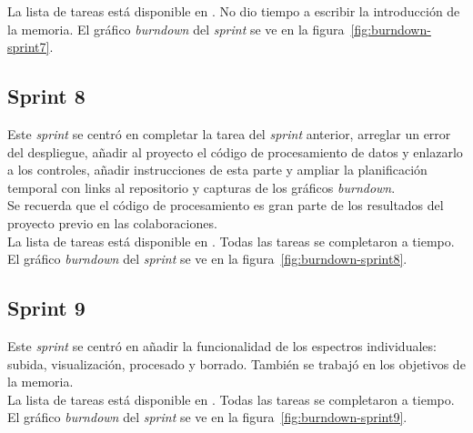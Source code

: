 La lista de tareas está disponible en
. No dio tiempo a escribir la introducción de la memoria. El gráfico
\textit{burndown} del \textit{sprint} se ve en la
figura~\ref{fig:burndown-sprint7}.\\


\subsection{Sprint 8}
Este \textit{sprint} se centró en completar la tarea del \textit{sprint}
anterior, arreglar un error del despliegue, añadir al proyecto el código
de procesamiento de datos y enlazarlo a los controles, añadir instrucciones de
esta parte y ampliar la planificación temporal con links al repositorio y
capturas de los gráficos \textit{burndown}.\\

Se recuerda que el código de procesamiento es gran parte de los resultados del
proyecto previo en las colaboraciones.\\

La lista de tareas está disponible en
. Todas las tareas se completaron a tiempo. El gráfico
\textit{burndown} del \textit{sprint} se ve en la
figura~\ref{fig:burndown-sprint8}.\\


\subsection{Sprint 9}
Este \textit{sprint} se centró en añadir la funcionalidad de los espectros
individuales: subida, visualización, procesado y borrado. También se trabajó en
los objetivos de la memoria.\\

La lista de tareas está disponible en
. Todas las tareas se completaron a tiempo. El gráfico
\textit{burndown} del \textit{sprint} se ve en la
figura~\ref{fig:burndown-sprint9}.\\


